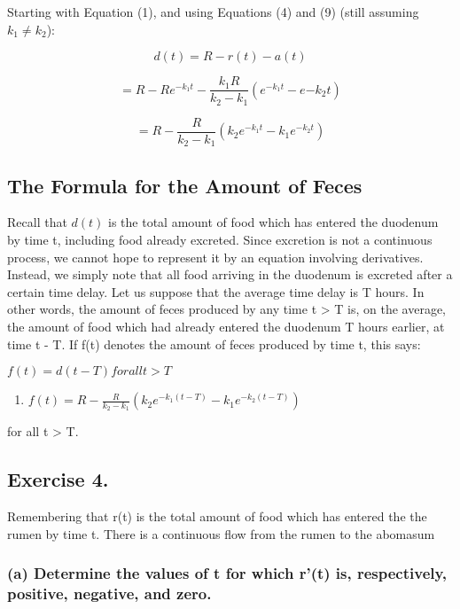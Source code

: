 \documentclass[]{article}
\providecommand{\tightlist}{%
  \setlength{\itemsep}{0pt}\setlength{\parskip}{0pt}}
\begin{document}
Starting with Equation (1), and using Equations (4) and (9) (still
assuming \(k_1 \neq k_2\)):

\[d(t) = R - r(t) - a(t)\]

\[= R - Re^{-k_1t} - \frac{k_1R}{k_2 - k_1} (e^{-k_1t}-e{-k_2t})\]

\[= R - \frac{R}{k_2-k_1}(k_2e^{-k_1t} - k_1e^{-k_2t})\]

\subsection{The Formula for the Amount of
Feces}\label{the-formula-for-the-amount-of-feces}

Recall that \(d(t)\) is the total amount of food which has entered the
duodenum by time t, including food already excreted. Since excretion is
not a continuous process, we cannot hope to represent it by an equation
involving derivatives. Instead, we simply note that all food arriving in
the duodenum is excreted after a certain time delay. Let us suppose that
the average time delay is T hours. In other words, the amount of feces
produced by any time t \textgreater{} T is, on the average, the amount
of food which had already entered the duodenum T hours earlier, at time
t - T. If f(t) denotes the amount of feces produced by time t, this
says:

\(f(t) = d(t-T) for all t > T\)

\begin{enumerate}
\def\labelenumi{(\arabic{enumi})}
\setcounter{enumi}{9}
\tightlist
\item
  \(f(t) = R - \frac{R}{k_2-k_1}(k_2e^{-k_1(t-T)}-k_1e^{-k_2(t-T)})\)
\end{enumerate}

for all t \textgreater{} T.

\subsection{Exercise 4.}\label{exercise-4.}

Remembering that r(t) is the total amount of food which has entered the
the rumen by time t. There is a continuous flow from the rumen to the
abomasum

\subsubsection{(a) Determine the values of t for which r'(t) is,
respectively, positive, negative, and
zero.}\label{a-determine-the-values-of-t-for-which-rt-is-respectively-positive-negative-and-zero.}
\end{document}
